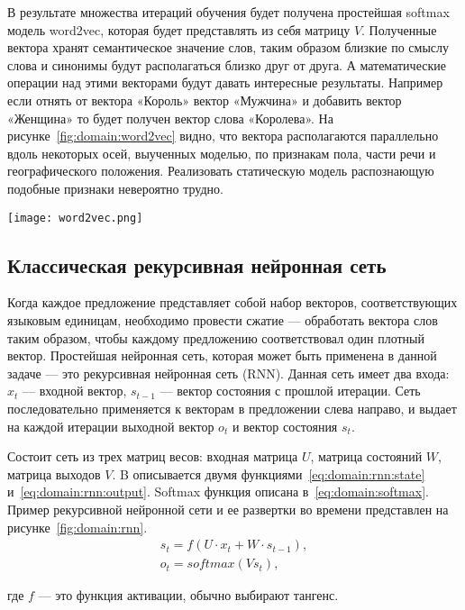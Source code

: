 В результате множества итераций обучения будет получена простейшая softmax модель word2vec, которая будет представлять из себя матрицу $V$. Полученные вектора хранят семантическое значение слов, таким образом близкие по смыслу слова и синонимы будут располагаться близко друг от друга. А математические операции над этими векторами будут давать интересные результаты. Например если отнять от вектора «Король» вектор «Мужчина» и добавить вектор «Женщина» то будет получен вектор слова «Королева». На рисунке~\ref{fig:domain:word2vec} видно, что вектора располагаются параллельно вдоль некоторых осей, выученных моделью, по признакам пола, части речи и географического положения. Реализовать статическую модель распознающую подобные признаки невероятно трудно\cite{word2vec}.
\begin{center}
  \texttt{[image: word2vec.png]}
  \label{fig:domain:word2vec}
\end{center}
\subsection{Классическая рекурсивная нейронная сеть}\label{subsec:domain:rnn}
Когда каждое предложение представляет собой набор векторов, соответствующих языковым единицам, необходимо провести сжатие --- обработать вектора слов таким образом, чтобы каждому предложению соответствовал один плотный вектор. Простейшая нейронная сеть, которая может быть применена в данной задаче --- это рекурсивная нейронная сеть (RNN). Данная сеть имеет два входа: $x_{t}$ --- входной вектор, $s_{t-1}$ --- вектор состояния с прошлой итерации. Сеть последовательно применяется к векторам в предложении слева направо, и выдает на каждой итерации выходной вектор $o_{t}$ и вектор состояния $s_t$.

Состоит сеть из трех матриц весов: входная матрица $U$, матрица состояний $W$, матрица выходов $V$. B описывается двумя функциями~\ref{eq:domain:rnn:state} и~\ref{eq:domain:rnn:output}. Softmax функция описана в~\ref{eq:domain:softmax}. Пример рекурсивной нейронной сети и ее развертки во времени представлен на рисунке~\ref{fig:domain:rnn}.
\begin{gather}
  \label{eq:domain:rnn:state}
  s_t = f(U\cdot{x_t} + W\cdot{s_{t-1}}),\\
  \label{eq:domain:rnn:output}
  o_t = softmax(Vs_t),
  \end{gather}
\begin{explanationx}
\item [где] $f$ --- это функция активации, обычно выбирают тангенс.
\end{explanationx}

